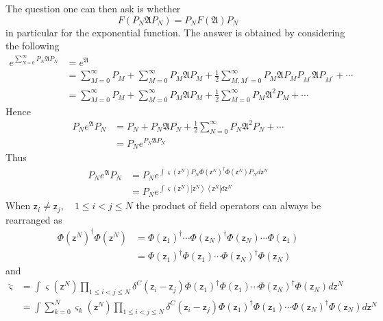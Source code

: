\documentclass[aps,preprint]{revtex4}%
\begin{document}
The question one can then ask is whether
\begin{equation}
F\left(  P_{N}\mathfrak{A}P_{N}\right)  =P_{N}F\left(  \mathfrak{A}\right)
P_{N}%
\end{equation}
in particular for the exponential function. The answer is obtained by
considering the following
\begin{align}
e^{\sum_{N=0}^{\infty}P_{N}\mathfrak{A}P_{N}} &  =e^{\mathfrak{A}}\nonumber\\
&  =\sum_{M=0}^{\infty}P_{M}+\sum_{M=0}^{\infty}P_{M}\mathfrak{A}P_{M}%
+\frac{1}{2}\sum_{M,M^{\prime}=0}^{\infty}P_{M}\mathfrak{A}P_{M}P_{M^{\prime}%
}\mathfrak{A}P_{M^{\prime}}+\cdots\nonumber\\
&  =\sum_{M=0}^{\infty}P_{M}+\sum_{M=0}^{\infty}P_{M}\mathfrak{A}P_{M}%
+\frac{1}{2}\sum_{M=0}^{\infty}P_{M}\mathfrak{A}^{2}P_{M}+\cdots
\end{align}
Hence
\begin{align}
P_{N}e^{\mathfrak{A}}P_{N} &  =P_{N}+P_{N}\mathfrak{A}P_{N}+\frac{1}{2}%
\sum_{N=0}^{\infty}P_{N}\mathfrak{A}^{2}P_{N}+\cdots\nonumber\\
&  =P_{N}e^{P_{N}\mathfrak{A}P_{N}}%
\end{align}
Thus
\begin{align}
P_{N}e^{\mathfrak{A}}P_{N} &  =P_{N}e^{\int\varsigma\left(  \mathsf{z}%
^{N}\right)  P_{N}\Phi\left(  \mathsf{z}^{N}\right)  ^{\dagger}\Phi\left(
\mathsf{z}^{N}\right)  P_{N}d\mathsf{z}^{N}}\nonumber\\
&  =P_{N}e^{\int\varsigma\left(  \mathsf{z}^{N}\right)  \left\vert
\mathsf{z}^{N}\right\rangle \left\langle \mathsf{z}^{N}\right\vert
d\mathsf{z}^{N}}%
\end{align}
When $\mathsf{z}_{i}\neq\mathsf{z}_{j},\quad1\leq i<j\leq N$ the product of
field operators can always be rearranged as
\begin{align}
\Phi\left(  \mathsf{z}^{N}\right)  ^{\dagger}\Phi\left(  \mathsf{z}%
^{N}\right)   &  =\Phi\left(  \mathsf{z}_{1}\right)  ^{\dagger}\cdots
\Phi\left(  \mathsf{z}_{N}\right)  ^{\dagger}\Phi\left(  \mathsf{z}%
_{N}\right)  \cdots\Phi\left(  \mathsf{z}_{1}\right)  \nonumber\\
&  =\Phi\left(  \mathsf{z}_{1}\right)  ^{\dagger}\Phi\left(  \mathsf{z}%
_{1}\right)  \cdots\Phi\left(  \mathsf{z}_{N}\right)  ^{\dagger}\Phi\left(
\mathsf{z}_{N}\right)
\end{align}
and%
\begin{align}
\breve{\varsigma} &  =\int\varsigma\left(  \mathsf{z}^{N}\right)  \prod_{1\leq
i<j\leq N}\delta^{C}\left(  \mathsf{z}_{i}-\mathsf{z}_{j}\right)  \Phi\left(
\mathsf{z}_{1}\right)  ^{\dagger}\Phi\left(  \mathsf{z}_{1}\right)  \cdots
\Phi\left(  \mathsf{z}_{N}\right)  ^{\dagger}\Phi\left(  \mathsf{z}%
_{N}\right)  d\mathsf{z}^{N}\nonumber\\
&  =\int\sum_{k=0}^{N}\varsigma_{k}\left(  \mathsf{z}^{N}\right)  \prod_{1\leq
i<j\leq N}\delta^{C}\left(  \mathsf{z}_{i}-\mathsf{z}_{j}\right)  \Phi\left(
\mathsf{z}_{1}\right)  ^{\dagger}\Phi\left(  \mathsf{z}_{1}\right)  \cdots
\Phi\left(  \mathsf{z}_{N}\right)  ^{\dagger}\Phi\left(  \mathsf{z}%
_{N}\right)  d\mathsf{z}^{N}%
\end{align}
\end{document}
